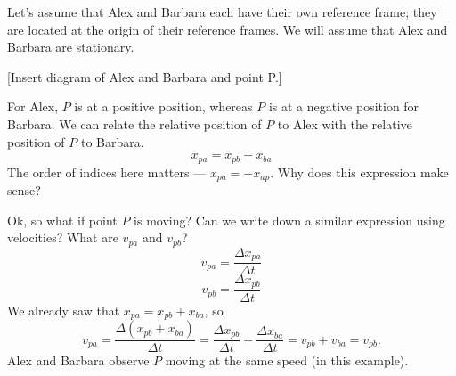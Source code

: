 Let's assume that Alex and Barbara each have their own reference frame; they are located at the origin of their reference frames. We will assume that Alex and Barbara are stationary.

[Insert diagram of Alex and Barbara and point P.]
\vspace{5cm}

For Alex, $P$ is at a positive position, whereas $P$ is at a negative position for Barbara. We can relate the relative position of $P$ to Alex with the relative position of $P$ to Barbara.
$$x_{pa}=x_{pb}+x_{ba}$$
The order of indices here matters --- $x_{pa}=-x_{ap}$. Why does this expression make sense?

Ok, so what if point $P$ is moving? Can we write down a similar expression using velocities? What are $v_{pa}$ and $v_{pb}$?
$$v_{pa}=\frac{\Delta{x_{pa}}}{\Delta{t}}$$
$$v_{pb}=\frac{\Delta{x_{pb}}}{\Delta{t}}$$
We already saw that $x_{pa}=x_{pb}+x_{ba}$, so
$$v_{pa}=\frac{\Delta(x_{pb}+x_{ba})}{\Delta{t}}=\frac{\Delta{x_{pb}}}{\Delta{t}}+\frac{\Delta{x_{ba}}}{\Delta{t}}=v_{pb}+v_{ba}=v_{pb}.$$
Alex and Barbara observe $P$ moving at the same speed (in this example).


\clearpage
